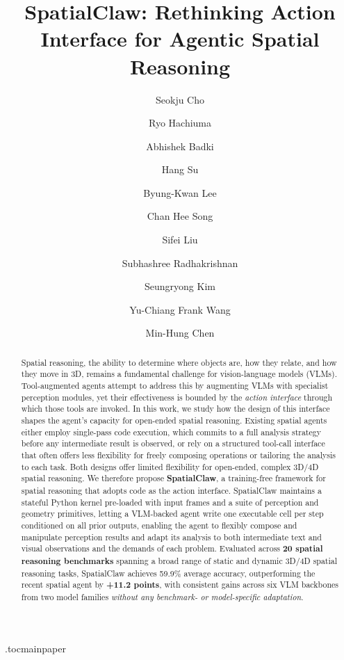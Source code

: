 \documentclass{llmxive}
\title{SpatialClaw: Rethinking Action Interface for Agentic Spatial Reasoning}
\author{Seokju Cho \and Ryo Hachiuma \and Abhishek Badki \and Hang Su \and Byung-Kwan Lee \and Chan Hee Song \and Sifei Liu \and Subhashree Radhakrishnan \and Seungryong Kim \and Yu-Chiang Frank Wang \and Min-Hung Chen}
\providecommand{\ours}{SpatialClaw}
\begin{document}
\maketitle
\begin{abstract}
Spatial reasoning, the ability to determine where objects are, how they relate, and how they move in 3D, remains a fundamental challenge for vision-language models (VLMs).
    Tool-augmented agents attempt to address this by augmenting VLMs with specialist perception modules, yet their effectiveness is bounded by the \emph{action interface} through which those tools are invoked.
    In this work, we study how the design of this interface shapes the agent's capacity for open-ended spatial reasoning.
    Existing spatial agents either employ single-pass code execution, which commits to a full analysis strategy before any intermediate result is observed, or rely on a structured tool-call interface that often offers less flexibility for freely composing operations or tailoring the analysis to each task. Both designs offer limited flexibility for open-ended, complex 3D/4D spatial reasoning.
    We therefore propose \textbf{\ours{}}, a training-free framework for spatial reasoning that adopts code as the action interface.
    \ours{} maintains a stateful Python kernel pre-loaded with input frames and a suite of perception and geometry primitives, letting a VLM-backed agent write one executable cell per step conditioned on all prior outputs, enabling the agent to flexibly compose and manipulate perception results and adapt its analysis to both intermediate text and visual observations and the demands of each problem.
    Evaluated across \textbf{20 spatial reasoning benchmarks} spanning a broad range of static and dynamic 3D/4D spatial reasoning tasks, \ours{} achieves 59.9\% average accuracy, outperforming the recent spatial agent by \textbf{+11.2 points}, with consistent gains across six VLM backbones from two model families \emph{without any benchmark- or model-specific adaptation}.
\end{abstract}
\etocdepthtag.toc{mainpaper}


\vspace{-6.5mm}

%
\end{document}
